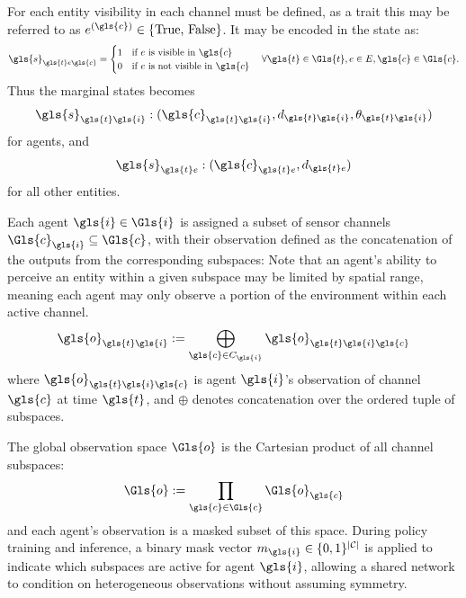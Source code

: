 For each entity visibility in each channel must be defined,
as a trait this may be referred to as \(e^{(\gls{c})} \in \{\text{True, False}\}\).
It may be encoded in the state as:
\[
    \gls{s}_{\gls{t}e\gls{c}} = %
    \begin{cases}
        1& \text{if \(e\) is visible in \(\gls{c}\)} \\ 
        0& \text{if \(e\) is not visible in \(\gls{c}\)}
    \end{cases} 
    \quad\forall \gls{t}\in\Gls{t}, e\in E, \gls{c}\in\Gls{c}.
\]
Thus the marginal states becomes
\[\gls{s}_{\gls{t}\gls{i}} :(\gls{c}_{\gls{t}\gls{i}},d_{\gls{t}\gls{i}},\theta_{\gls{t}\gls{i}})\]
for agents, and
\[\gls{s}_{\gls{t}e} :(\gls{c}_{\gls{t}e},d_{\gls{t}e})\]
for all other entities.

Each agent \(\gls{i} \in\Gls{i}\) is assigned a subset of sensor channels 
\(\Gls{c}_{\gls{i}} \subseteq \Gls{c}\), %
with their observation defined as the concatenation of the outputs 
from the corresponding subspaces:
Note that an agent's ability to perceive an entity within a given 
subspace may be limited by spatial range, meaning each agent may 
only observe a portion of the environment within each active channel.
\[
    \gls{o}_{\gls{t}\gls{i}} 
    := \bigoplus_{\gls{c} \in {C}_{\gls{i}}} \gls{o}_{\gls{t}\gls{i}\gls{c}}
\]
where \(\gls{o}_{\gls{t}\gls{i}\gls{c}}\) is agent \(\gls{i}\)'s 
observation of channel \(\gls{c}\) at time \(\gls{t}\), 
and \(\oplus\) denotes concatenation over the ordered tuple of subspaces.

The global observation space \(\Gls{o}\) is the Cartesian product of all channel subspaces:
\[
    \Gls{o} := \prod_{\gls{c}\in{\Gls{c}}} \Gls{o}_{\gls{c}}
\]
and each agent's observation is a masked subset of this space.
During policy training and inference, a binary mask vector 
\(m_{\gls{i}} \in \{0,1\}^{|\mathcal{C}|}\) is applied to 
indicate which subspaces are active for agent \(\gls{i}\), 
allowing a shared network to condition on heterogeneous 
observations without assuming symmetry.

